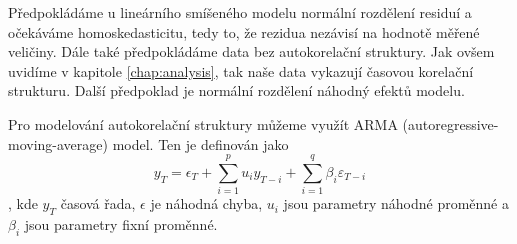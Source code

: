 Předpokládáme u lineárního smíšeného modelu normální rozdělení residuí a očekáváme homoskedasticitu, tedy to, že rezidua nezávisí na hodnotě měřené veličiny. Dále také předpokládáme data bez autokorelační struktury. Jak ovšem uvidíme v kapitole \ref{chap:analysis}, tak naše data vykazují časovou korelační strukturu. Další předpoklad je normální rozdělení náhodný efektů modelu\cite{hefleytrevorj2017}. 

Pro modelování autokorelační struktury můžeme využít ARMA (autoregressive-moving-average) model. Ten je definován jako\cite{wilsongranville2016}
$$y_T = \epsilon_T + \sum_{i=1}^{p}u_i y_{T-i} + \sum_{i=1}^{q}\beta_i\varepsilon_{T-i}$$,
kde $y_T$ časová řada, $\epsilon$ je náhodná chyba, $u_i$ jsou parametry náhodné proměnné a $\beta_i$ jsou parametry fixní proměnné. 
